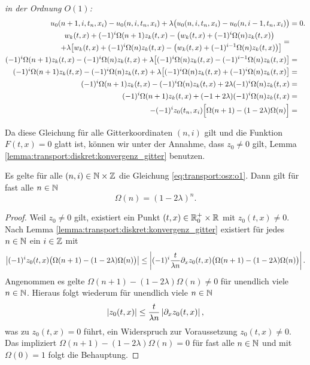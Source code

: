 \noindent \emph{in der Ordnung $O(1)$:}
{\small \begin{align}\label{eq:transport:osz:o1} 
u_0(n+1, i, t_n, x_i) - u_0(n, i, t_n, x_i) + \lambda \bigl(u_0(n, i, t_n, x_i) - u_0(n, i-1, t_n, x_i) \bigr) &= 0. \nonumber\\
\begin{split}
w_k(t, x) + (-1)^i \Omega(n+1) z_k(t, x) - \bigl( w_k(t, x) + (-1)^i \Omega(n) z_k(t, x) \bigr) \quad &\nonumber\\
+ \lambda \bigl[ w_k(t, x) + (-1)^i \Omega(n) z_k(t, x) - \bigl( w_k(t, x) + (-1)^{i-1} \Omega(n) z_k(t, x) \bigr) \bigr]&
\end{split} = \nonumber\\
(-1)^i \Omega(n+1) z_k(t, x) - (-1)^i \Omega(n) z_k(t, x) + \lambda \bigl[ (-1)^i \Omega(n) z_k(t, x) - (-1)^{i-1} \Omega(n) z_k(t, x) \bigr] & =\nonumber\\
(-1)^i \Omega(n+1) z_k(t, x) - (-1)^i \Omega(n) z_k(t, x) + \lambda \bigl[ (-1)^i \Omega(n) z_k(t, x) + (-1)^{i} \Omega(n) z_k(t, x) \bigr] & =\nonumber\\
(-1)^i \Omega(n+1) z_k(t, x) - (-1)^i \Omega(n) z_k(t, x) + 2 \lambda (-1)^i \Omega(n) z_k(t, x) & =\nonumber\\
(-1)^i \Omega(n+1) z_k(t, x) + (-1 + 2\lambda) (-1)^i \Omega(n) z_k(t, x) & =\nonumber\\
- (-1)^i z_0(t_n, x_i) \Bigl[ \Omega(n+1) - ( 1 - 2 \lambda ) \Omega(n) \Bigr] & =
\end{align} }

Da diese Gleichung für alle Gitterkoordinaten $(n,i)$ gilt und die Funktion $F(t,x) = 0$ glatt ist, können wir unter der Annahme, dass $z_0 \neq 0$ gilt, Lemma \ref{lemma:transport:diskret:konvergenz_gitter} benutzen.
\\

\begin{satz}\label{satz:omega_n}
Es gelte für alle $(n,i) \in \mathbb N \times \mathbb Z$ die Gleichung \eqref{eq:transport:osz:o1}. Dann gilt für fast alle $n \in \mathbb N$
\[ \Omega(n) = (1 - 2 \lambda)^n. \]
\end{satz}
\begin{proof}
Weil $z_0 \neq 0$ gilt, existiert ein Punkt $(t,x) \in \mathbb R^+_0 \times \mathbb R$ mit $z_0(t,x) \neq 0$.
Nach Lemma \ref{lemma:transport:diskret:konvergenz_gitter} existiert für jedes $n \in \mathbb N$ ein $i \in \mathbb Z$ mit
\[  \left| (-1)^i z_0(t, x) \bigl( \Omega(n+1) - ( 1 - 2 \lambda ) \Omega(n) \bigr) \right| \leq \left| (-1)^i \frac {t}{\lambda n} \partial_x z_0(t, x) \bigl( \Omega(n+1) - ( 1 - 2 \lambda ) \Omega(n) \bigr) \right|. \]
Angenommen es gelte $\Omega(n+1) - ( 1 - 2 \lambda ) \Omega(n) \neq 0$ für unendlich viele $n \in \mathbb N$.
Hieraus folgt wiederum für unendlich viele $n \in \mathbb N$
\[ \left| z_0(t, x) \right| \leq \frac {t}{\lambda n} \left| \partial_x z_0(t,x) \right|, \]
was zu $z_0(t,x) = 0$ führt, ein Widerspruch zur Voraussetzung $z_0(t,x) \neq 0$.
Das impliziert $\Omega(n+1) - ( 1 - 2 \lambda ) \Omega(n) = 0$ für fast alle $n \in \mathbb N$ und mit $\Omega(0) = 1$ folgt die Behauptung.
\end{proof}

